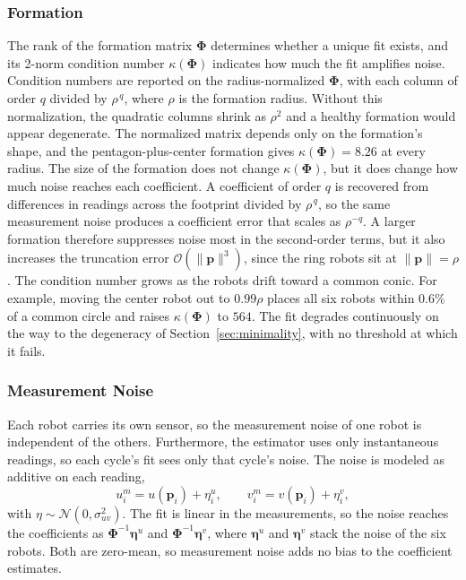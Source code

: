 \documentclass[lettersize,journal]{IEEEtran}
\begin{document}
\subsubsection{Formation}
The rank of the formation matrix $\boldsymbol{\Phi}$ determines whether
a unique fit exists, and its 2-norm condition number $\kappa(\boldsymbol{\Phi})$
indicates how much the fit amplifies noise. Condition numbers are
reported on the radius-normalized $\boldsymbol{\Phi}$, with each column
of order $q$ divided by $\rho^{\,q}$, where $\rho$ is the formation radius. Without this normalization, the
quadratic columns shrink as $\rho^{2}$ and a healthy formation would
appear degenerate. The normalized matrix depends only on the formation's
shape, and the pentagon-plus-center formation gives
$\kappa(\boldsymbol{\Phi}) = 8.26$ at every radius. The size of the formation does not change
$\kappa(\boldsymbol{\Phi})$, but it does change how much noise reaches
each coefficient. A coefficient of order $q$ is recovered from
differences in readings across the footprint divided by $\rho^{\,q}$, so
the same measurement noise produces a coefficient error that scales as
$\rho^{-q}$. A larger formation therefore suppresses noise most in the
second-order terms, but it also increases the truncation error
$\mathcal{O}(\|\mathbf{p}\|^3)$, since the ring robots sit at
$\|\mathbf{p}\| = \rho$. The condition number grows as the robots
drift toward a common conic. For example, moving the center robot out
to $0.99\rho$ places all six robots within $0.6\%$ of a common circle
and raises $\kappa(\boldsymbol{\Phi})$ to $564$. The fit degrades
continuously on the way to the degeneracy of
Section~\ref{sec:minimality}, with no threshold at which it fails.

\subsubsection{Measurement Noise}
Each robot carries its own sensor, so the measurement noise of one robot
is independent of the others. Furthermore, the estimator uses only
instantaneous readings, so each cycle's fit sees only that cycle's
noise. The noise is modeled as additive on each reading,
\begin{equation}
    u_i^m = u(\mathbf{p}_i) + \eta_i^u, \qquad
    v_i^m = v(\mathbf{p}_i) + \eta_i^v,
    \label{eq:meas_noise}
\end{equation}
with $\eta \sim \mathcal{N}(0, \sigma_{uv}^2)$. The fit is linear in the
measurements, so the noise reaches the coefficients as
$\boldsymbol{\Phi}^{-1}\boldsymbol{\eta}^u$ and
$\boldsymbol{\Phi}^{-1}\boldsymbol{\eta}^v$, where $\boldsymbol{\eta}^u$
and $\boldsymbol{\eta}^v$ stack the noise of the six robots. Both are
zero-mean, so measurement noise adds no bias to the coefficient estimates.
\end{document}

